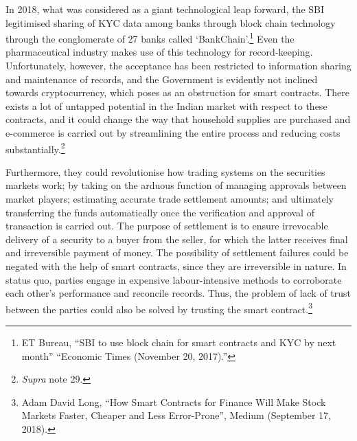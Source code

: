 \begin{multicols}{2}

\noi
In 2018, what was considered as a giant technological leap forward, the SBI legitimised
sharing of KYC data among banks through block chain technology through the conglomerate
of 27 banks called ‘BankChain’.\footnote{ET Bureau, “SBI to use block chain for smart contracts and KYC by next month” “Economic Times
(November 20, 2017).”} Even the pharmaceutical industry makes use of this technology for record-keeping. Unfortunately, however, the acceptance has been restricted to
information sharing and maintenance of records, and the Government is evidently not
inclined towards cryptocurrency, which poses as an obstruction for smart contracts. There
exists a lot of untapped potential in the Indian market with respect to these contracts, and it
could change the way that household supplies are purchased and e-commerce is carried out
by streamlining the entire process and reducing costs substantially.\footnote{\textit{Supra} note 29. }

\noi
Furthermore, they could revolutionise how trading systems on the securities markets work;
by taking on the arduous function of managing approvals between market players; estimating
accurate trade settlement amounts; and ultimately transferring the funds automatically once
the verification and approval of transaction is carried out. The purpose of settlement is to
ensure irrevocable delivery of a security to a buyer from the seller, for which the latter
receives final and irreversible payment of money. The possibility of settlement failures could
be negated with the help of smart contracts, since they are irreversible in nature. In status
quo, parties engage in expensive labour-intensive methods to corroborate each other’s
performance and reconcile records. Thus, the problem of lack of trust between the parties
could also be solved by trusting the smart contract.\footnote{Adam David Long, “How Smart Contracts for Finance Will Make Stock Markets Faster, Cheaper and Less
Error-Prone”, Medium (September 17, 2018).}

\vspace{-.1cm}


\vspace{-.2cm}


\end{multicols}
